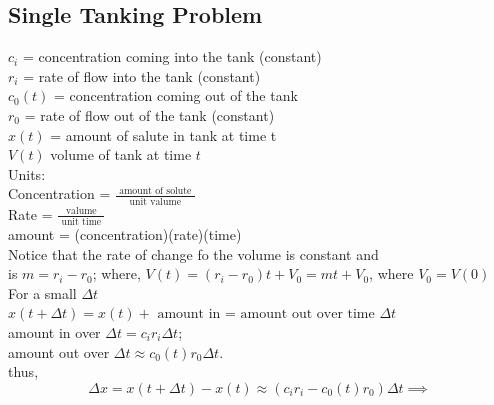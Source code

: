 \documentclass[10pt,a4paper]{article}
\begin{document}
\subsection*{Single Tanking Problem}
\( c_i\) = concentration coming into the tank (constant) \\
\( r_i\) = rate of flow into the tank (constant) \\
\( c_0(t)\) = concentration coming out of the tank \\
\( r_0\) = rate of flow out of the tank (constant) \\
\( x(t) \) = amount of salute in tank at time t \\
\( V(t)\) volume of tank at time \( t\) \\[5mm] 
Units: \\
Concentration = \( \frac{ \text{ amount of solute }}{ \text{ unit
valume	 }}\) \\ 
Rate = \( \frac{ \text{ valume }}{ \text{ unit time }}\) \\	 
amount = (concentration)(rate)(time) \\[5mm]
Notice that the rate of change fo the volume is constant and  \\
is \( m = r_i - r_0\); where, \( V(t) = (r_i - r_0)t + V_0 = mt +
V_0\), where \( V_0 = V(0)\) \\
For a small \( \Delta t\)\nonumber\\
\( x(t + \Delta t) = x(t) + \text{ amount in = amount out over time }
\Delta t\) \\[5mm]
amount in over \( \Delta t = c_i r_i \Delta t\); \\
amount out over \( \Delta t \approx c_0(t) r_0 \Delta t\). \\
thus,  \\
\[ \Delta x = x(t + \Delta t) - x(t) \approx (c_i r_i - c_0(t)r_0) \Delta
t \implies \]
\end{document}
